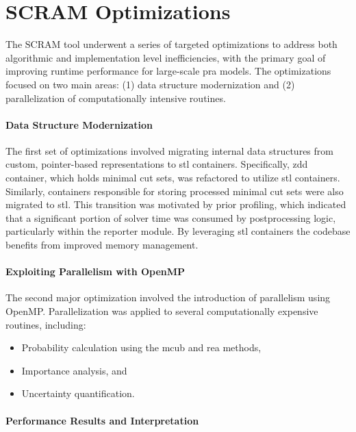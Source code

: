 \section{SCRAM Optimizations}

The SCRAM tool underwent a series of targeted optimizations to address both algorithmic and implementation level inefficiencies, with the primary goal of improving runtime performance for large-scale \acrshort{pra} models. The optimizations focused on two main areas: (1) data structure modernization and (2) parallelization of computationally intensive routines.

\paragraph{Data Structure Modernization}

The first set of optimizations involved migrating internal data structures from custom, pointer-based representations to \acrfull{stl} containers. Specifically, \acrshort{zdd} container, which holds minimal cut sets, was refactored to utilize \acrshort{stl} containers. Similarly, containers responsible for storing processed minimal cut sets were also migrated to \acrshort{stl}. This transition was motivated by prior profiling, which indicated that a significant portion of solver time was consumed by postprocessing logic, particularly within the reporter module. By leveraging \acrshort{stl} containers the codebase benefits from improved memory management.
 
\paragraph{Exploiting Parallelism with OpenMP}

The second major optimization involved the introduction of parallelism using OpenMP. Parallelization was applied to several computationally expensive routines, including:

\begin{itemize}
    \item Probability calculation using the \acrshort{mcub} and \acrshort{rea} methods,
    \item Importance analysis, and
    \item Uncertainty quantification.
\end{itemize}

\paragraph{Performance Results and Interpretation}

